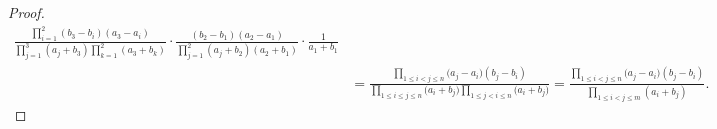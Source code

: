 \documentclass[../../main.tex]{subfiles}%
\begin{document}
\begin{proof}
\begin{align*}
\frac{\prod\limits_{i=1}^2{\left( b_3-b_i \right) \left( a_3-a_i \right)}}{\prod\limits_{j=1}^3{\left( a_j+b_3 \right) \prod\limits_{k=1}^2{\left( a_3+b_k \right)}}}\cdot \frac{\left( b_2-b_1 \right) \left( a_2-a_1 \right)}{\prod\limits_{j=1}^2{\left( a_j+b_2 \right) \left( a_2+b_1 \right)}}\cdot \frac{1}{a_1+b_1}
\\
&=\frac{\prod\limits_{1\leqslant i<j\leqslant n}{(a_j}-a_i)(b_j-b_i)}{\prod\limits_{1\leqslant i\leqslant j\leqslant n}{(a_i}+b_j)\prod\limits_{1\leqslant j<i\leqslant n}{(a_i}+b_j)}=\frac{\prod\limits_{1\leqslant i<j\leqslant n}{(a_j}-a_i)(b_j-b_i)}{\prod\limits_{1\leqslant i<j\leqslant m}{\left( a_i+b_j \right)}}.
\nonumber
\end{align*}

\end{proof}
\end{document}
